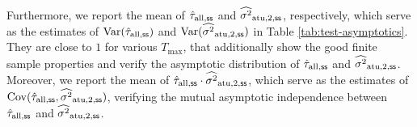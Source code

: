 Furthermore, we report the mean of $\hat{\tau}_{\mathrm{all},{\mathsf{ss}}}$ and $\widehat{\sigma^2}_{\mathrm{atu},2,{\mathsf{ss}}}$, respectively, which serve as the estimates of $\mathrm{Var}(\hat{\tau}_{\mathrm{all},{\mathsf{ss}}})$ and $\mathrm{Var}(\widehat{\sigma^2}_{\mathrm{atu},2,{\mathsf{ss}}})$ in Table \ref{tab:test-asymptotics}.
They are close to $1$ for various $T_{\max}$, that additionally show the good finite sample properties and verify the asymptotic distribution of $\hat{\tau}_{\mathrm{all},{\mathsf{ss}}}$ and $\widehat{\sigma^2}_{\mathrm{atu},2,{\mathsf{ss}}}$. Moreover, we report the mean of $\hat{\tau}_{\mathrm{all},{\mathsf{ss}}} \cdot \widehat{\sigma^2}_{\mathrm{atu},2,{\mathsf{ss}}}$, which serve as the estimates of $\mathrm{Cov}(\hat{\tau}_{\mathrm{all},{\mathsf{ss}}}, \widehat{\sigma^2}_{\mathrm{atu},2,{\mathsf{ss}}})$, verifying the mutual asymptotic independence between $\hat{\tau}_{\mathrm{all},{\mathsf{ss}}}$ and $\widehat{\sigma^2}_{\mathrm{atu},2,{\mathsf{ss}}}$. 




